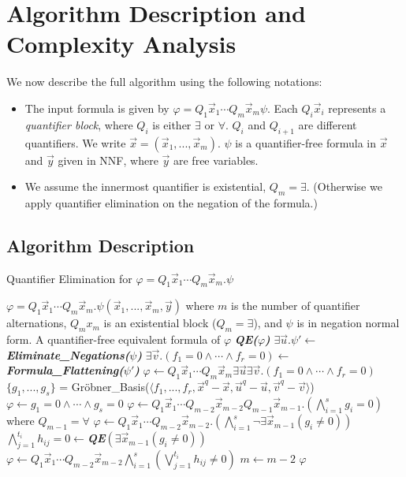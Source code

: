 \documentclass[envcountsect]{llncs}
\begin{document}
\section{Algorithm Description and Complexity Analysis}

We now describe the full algorithm using the following notations:
\begin{itemize}
\item The input formula is given by $\varphi = Q_1\vec x_1\cdots Q_m \vec x_m \psi $. Each $Q_i\vec x_i$ represents a {\em quantifier block}, where $Q_i$ is either $\exists$ or $\forall$. $Q_{i}$ and $Q_{i+1}$ are different quantifiers. We write $\vec x=(\vec x_1,...,\vec x_m)$. $\psi$ is a quantifier-free formula in $\vec x$ and $\vec y$ given in NNF, where $\vec y$ are free variables. 
\item We assume the innermost quantifier is existential, $Q_m=\exists$. (Otherwise we apply quantifier elimination on the negation of the formula.)
\end{itemize}
\subsection{Algorithm Description}
\begin{algorithm}[h]
\caption{Quantifier Elimination for $\varphi= Q_1 \vec x_1\cdots Q_m\vec x_m. \psi$}
\label{mainalgo}
    \begin{algorithmic}[1]
 $\varphi= Q_1 \vec x_1\cdots Q_m\vec x_m.\psi(\vec x_1,...,\vec x_m, \vec y)$ where $m$ is the number of quantifier alternations, $Q_mx_m$ is an existential block ($Q_m = \exists$), and $\psi$ is in negation normal form.
 A quantifier-free equivalent formula of $\varphi$
 {\bf\em QE($\varphi$)}
\STATE $\exists\vec u. \psi' \gets$ {\bf\em Eliminate\_Negations($\psi$)}
\STATE $\exists\vec v. (f_1=0\wedge \cdots \wedge f_r=0)\gets$ {\bf\em Formula\_Flattening($\psi'$)}
\STATE $\varphi \gets Q_1 \vec x_1\cdots Q_m\vec x_m\exists \vec u\exists \vec v. (f_1=0\wedge \cdots \wedge f_r=0)$
\STATE $\{g_1,...,g_{s}\}$ = Gr\"obner\_Basis($\langle f_1,...,f_r,\vec x^q-\vec x, \vec u^q-\vec u, \vec v^q-\vec v\rangle$)
\STATE $\varphi\gets g_1=0\wedge \cdots \wedge g_s=0$
\ENDIF
\STATE $\varphi \gets Q_1\vec x_1\cdots  Q_{m-2} \vec x_{m-2} Q_{m-1} \vec x_{m-1}. (\bigwedge_{i=1}^s g_i=0)$ where $Q_{m-1}=\forall$
\STATE $\varphi \gets Q_1 \vec x_1\cdots Q_{m-2} \vec x_{m-2}. (\bigwedge_{i=1}^{s} \neg \exists \vec x_{m-1} (g_i\neq 0))$ 
\STATE $\bigwedge_{j=1}^{t_i} h_{ij}=0 \gets${\bf \em QE}$(\exists \vec x_{m-1} (g_i\neq 0))$
\ENDFOR
\STATE $\varphi \gets Q_1 \vec x_1\cdots Q_{m-2} \vec x_{m-2} \bigwedge_{i=1}^{s} (\bigvee_{j=1}^{t_i} h_{ij}\neq 0)$
\STATE $m\gets m-2$
\ENDWHILE
\RETURN $\varphi$
    \end{algorithmic}
\end{algorithm}
\end{document}
